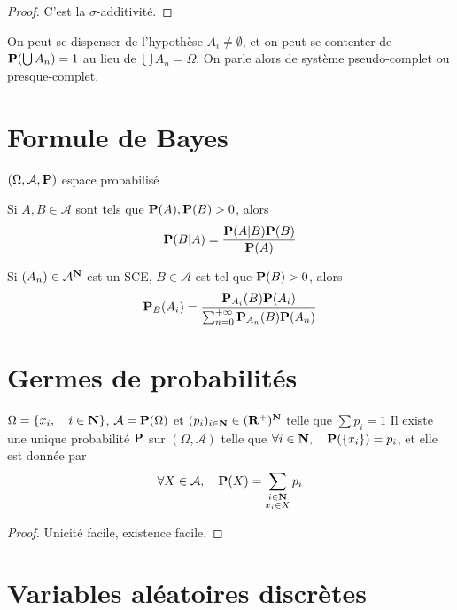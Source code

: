 \begin{proof}
    C'est la $\sigma$-additivité.
\end{proof}

\begin{rem}
    On peut se dispenser de l'hypothèse $A_i\neq \emptyset$, et on peut se contenter de  $\P(\bigcup A_n )=1$ au lieu de $ \bigcup A_n=\Omega $. On parle alors de système pseudo-complet ou presque-complet.
\end{rem}

\section{Formule de Bayes}

\begin{thm}[Bayes]
    \Hyp $(\Omega, \mathcal A, \P)$ espace probabilisé
    \begin{concenum}
        \item Si $A,B\in \mathcal A$ sont tels que $\P(A), \P(B)>0$, alors \[
            \P(B|A)=\frac{\P(A|B)\P(B)}{\P(A)}
        \] 
    \item Si $(A_n)\in  \mathcal A^{\N}$ est un SCE, $B\in \mathcal A$ est tel que $\P(B)>0$, alors \[
            \P_B(A_i)=\frac{\P_{A_i}(B)\P(A_i)}{\sum_{n=0}^{+\infty} \P_{A_n}(B)\P(A_n)}
    \] 
    \end{concenum}
\end{thm}

\section{Germes de probabilités}

\begin{prop}
    \Hyp $\Omega=\{x_i, \quad i \in  \N\}$, $\mathcal A=\mathcal \P(\Omega)$ et $(p_i)_{i \in \N} \in (\R^+)^{\N}$ telle que $\sum p_i=1$
    \Conc Il existe une unique probabilité $\P$ sur $(\Omega, \mathcal A)$ telle que $\forall i \in  \N,\quad \P(\{x_i\})=p_i$, et elle est donnée par \[
        \forall X \in  \mathcal A,\quad \P(X)=\sum_{\substack{i \in  \N\\x_i\in X}}p_i
    \] 
\end{prop}

\begin{proof}
    Unicité facile, existence facile.
\end{proof}

\section{Variables aléatoires discrètes}

